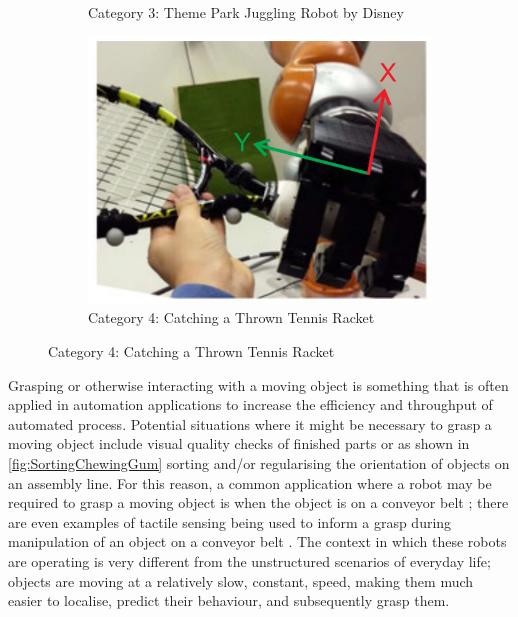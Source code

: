 \begin{figure}
\begin{subfigure}{.4\linewidth}
        \caption[Category 3: Theme Park Juggling Robot by Disney]{Category 3: Theme Park Juggling Robot by Disney \cite{DisneyRobot}}
        \label{fig:DisneyBot}
    \end{subfigure}
    \begin{subfigure}{.5\linewidth}
        \centering
    \includegraphics[width=.8\textwidth]{Images/CatchingObjectInFlight.png}
        \caption[Category 4: Catching a Thrown Tennis Racket]{Category 4: Catching a Thrown Tennis Racket \cite{DisneyRobot}}
        \label{fig:TennisRacket}
    \end{subfigure}
\end{figure}

Grasping or otherwise interacting with a moving object is something that is often applied in automation applications to increase the efficiency and throughput of automated process. Potential situations where it might be necessary to grasp a moving object include visual quality checks of finished parts or as shown in \ref{fig:SortingChewingGum} sorting and/or regularising the orientation of objects on an assembly line. For this reason, a common application where a robot may be required to grasp a moving object is when the object is on a conveyor belt \cite{ConveyorBeltTracking, FingertipEmitterReceiverMovingObjectII,FingertipEmitterReceiverMovingObject}; there are even examples of tactile sensing being used to inform a grasp during manipulation of an object on a conveyor belt \cite{ConveyorUnknownObject}. The context in which these robots are operating is very different from the unstructured scenarios of everyday life; objects are moving at a relatively slow, constant, speed, making them much easier to localise, predict their behaviour, and subsequently grasp them.

